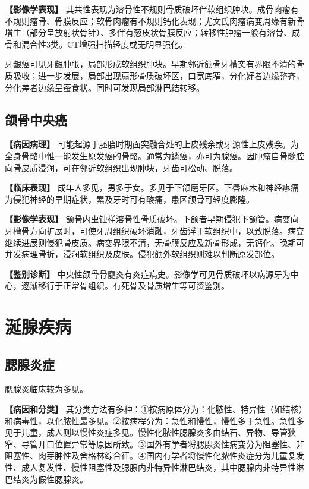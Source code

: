\textbf{【影像学表现】}
其共性表现为溶骨性不规则骨质破坏伴软组织肿块。成骨肉瘤有不规则瘤骨、骨膜反应；软骨肉瘤有不规则钙化表现；尤文氏肉瘤病变周缘有新骨增生（部分呈放射状骨针）、多伴有葱皮状骨膜反应；转移性肿瘤一般有溶骨、成骨和混合性3类。CT增强扫描轻度或无明显强化。

牙龈癌可见牙龈肿胀，局部形成软组织肿块。早期邻近颌骨牙槽突有界限不清的骨质吸收；进一步发展，局部出现扇形骨质破坏区，口宽底窄，分化好者边缘整齐，分化差者边缘呈蚕食状。同时可发现局部淋巴结转移。

\subsection{颌骨中央癌}

\textbf{【病因病理】}
可能起源于胚胎时期面突融合处的上皮残余或牙源性上皮残余。为全身骨骼中惟一能发生原发癌的骨骼。通常为鳞癌，亦可为腺癌。因肿瘤自骨髓腔向骨皮质浸润，可在邻近软组织出现肿块，牙齿可松动、脱落。

\textbf{【临床表现】}
成年人多见，男多于女。多见于下颌磨牙区。下唇麻木和神经疼痛为侵犯神经的早期症状，累及牙时可有酸痛，患区颌骨可轻度膨隆。

\textbf{【影像学表现】}
颌骨内虫蚀样溶骨性骨质破坏。下颌者早期侵犯下颌管。病变向牙槽骨方向扩展时，可使牙周组织破坏消融，牙齿浮于软组织中，以致脱落。病变继续进展则侵犯骨皮质。病变界限不清，无骨膜反应及新骨形成，无钙化。晚期可并发病理骨折，浸润软组织及皮肤。侵犯颌外软组织则难以判断原发部位。

\textbf{【鉴别诊断】}
中央性颌骨骨髓炎有炎症病史。影像学可见骨质破坏以病源牙为中心，逐渐移行于正常骨组织。有死骨及骨质增生等可资鉴别。

\section{涎腺疾病}

\subsection{腮腺炎症}

腮腺炎临床较为多见。

\textbf{【病因和分类】}
其分类方法有多种：①按病原体分为：化脓性、特异性（如结核）和病毒性，以化脓性最多见。②按病程分为：急性和慢性，慢性多于急性。急性多见于儿童，成人则以慢性炎症多见。慢性化脓性腮腺炎多由结石、异物、导管狭窄、导管开口位置异常等原因所致。③国外有学者将腮腺炎性病变分为阻塞性、非阻塞性、肉芽肿性及舍格林综合征。④国内有学者将慢性化脓性炎症分为儿童复发性、成人复发性、慢性阻塞性及腮腺内非特异性淋巴结炎，其中腮腺内非特异性淋巴结炎为假性腮腺炎。

